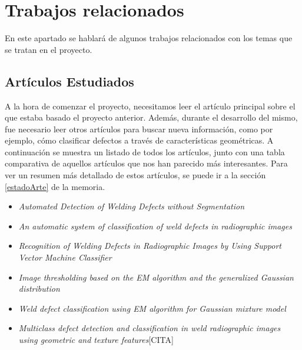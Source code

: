 \chapter{Trabajos relacionados}

En este apartado se hablará de algunos trabajos relacionados con los temas que se tratan en el proyecto.

\section{Artículos Estudiados}
A la hora de comenzar el proyecto, necesitamos leer el artículo principal sobre el que estaba basado el proyecto anterior. Además, durante el desarrollo del mismo, fue necesario leer otros artículos para buscar nueva información, como por ejemplo, cómo clasificar defectos a través de características geométricas. A continuación se muestra un listado de todos los artículos, junto con una tabla comparativa  de aquellos artículos que nos han parecido más interesantes. Para ver un resumen más detallado de estos artículos, se puede ir a la sección \ref{estadoArte} de la memoria. 

\begin{itemize}
		\item\textit{Automated Detection of Welding Defects without Segmentation} \cite{DomingoMery}
		\item \textit{An automatic system of classification of weld defects in radiographic images} \cite{vilar2009automatic}
		\item \textit{Recognition of Welding Defects in Radiographic Images by Using Support Vector Machine Classifier} \cite{wang2010recognition}
		\item \textit{Image thresholding based on the EM algorithm and the generalized Gaussian distribution} \cite{bazi2007image}
		\item \textit{Weld defect classification using EM algorithm for Gaussian mixture model} \cite{Tridi}
		\item \textit{Multiclass defect detection and classification in weld radiographic images
using geometric and texture features}[CITA]
	\end{itemize}


